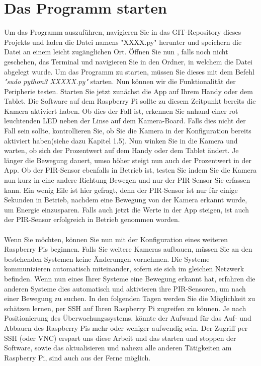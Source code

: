 \documentclass[12pt,a4paper]{scrreprt}
\begin{document}
\section{Das Programm starten}
Um das Programm auszuführen, navigieren Sie in das GIT-Repository dieses Projekts und laden die Datei namens "XXXX.py" herunter und speichern die Datei an einem leicht zugänglichen Ort. Öffnen Sie nun , falls noch nicht geschehen, das Terminal und navigieren Sie in den Ordner, in welchem die Datei abgelegt wurde. Um das Programm zu starten, müssen Sie dieses mit dem Befehl \textit{"sudo python3 XXXXX.py"} starten. Nun können wir die Funktionalität der Peripherie testen. Starten Sie jetzt zunächst die App auf Ihrem Handy oder dem Tablet. Die Software auf dem Raspberry Pi sollte zu diesem Zeitpunkt bereits die Kamera aktiviert haben. Ob dies der Fall ist, erkennen Sie anhand einer rot leuchtenden LED neben der Linse auf dem Kamera-Board. Falls dies nicht der Fall sein sollte, kontrollieren Sie, ob Sie die Kamera in der Konfiguration bereits aktiviert haben(siehe dazu Kapitel 1.5). Nun winken Sie in die Kamera und warten, ob sich der Prozentwert auf dem Handy oder dem Tablet ändert. Je länger die Bewegung dauert, umso höher steigt nun auch der Prozentwert in der App. Ob der PIR-Sensor ebenfalls in Betrieb ist, testen Sie indem Sie die Kamera nun kurz in eine andere Richtung Bewegen und nur der PIR-Sensor Sie erfassen kann. Ein wenig Eile ist hier gefragt, denn der PIR-Sensor ist nur für einige Sekunden in Betrieb, nachdem eine Bewegung von der Kamera erkannt wurde, um Energie einzusparen. Falls auch jetzt die Werte in der App steigen, ist auch der PIR-Sensor erfolgreich in Betrieb genommen worden.\\ \\Wenn Sie möchten, können Sie nun mit der Konfiguration eines weiteren Raspberry Pis beginnen. Falls Sie weitere Kameras aufbauen, müssen Sie an den bestehenden Systemen keine Änderungen vornehmen. Die Systeme kommunizieren automatisch miteinander, sofern sie sich im gleichen Netzwerk befinden. Wenn nun eines Ihrer Systeme eine Bewegung erkannt hat, erfahren die anderen Systeme dies automatisch und aktivieren ihre PIR-Sensoren, um nach einer Bewegung zu suchen. In den folgenden Tagen werden Sie die Möglichkeit zu schätzen lernen, per SSH auf Ihren Raspberry Pi zugreifen zu können. Je nach Positionierung des Überwachungssystems, könnte der Aufwand für das Auf- und Abbauen des Raspberry Pis mehr oder weniger aufwendig sein. Der Zugriff per SSH (oder VNC) erspart uns diese Arbeit und das starten und stoppen der Software, sowie das aktualisieren und nahezu alle anderen Tätigkeiten am Raspberry Pi, sind auch aus der Ferne möglich.
\end{document}

